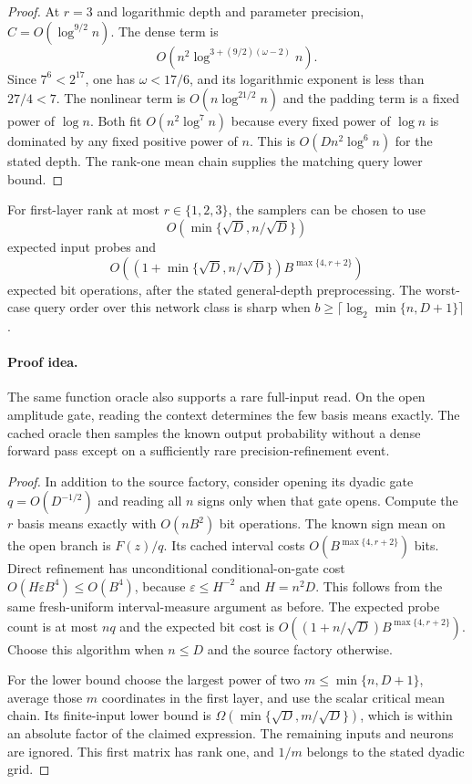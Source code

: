 \begin{proof}
At $r=3$ and logarithmic depth and parameter precision,
$C=O(\log^{9/2}n)$. The dense term is
\[
 O\!\left(n^2\log^{3+(9/2)(\omega-2)}n\right).
\]
Since $7^6<2^{17}$, one has $\omega<17/6$, and its logarithmic
exponent is less than $27/4<7$. The nonlinear term is
$O(n\log^{21/2}n)$ and the padding term is a fixed power of
$\log n$. Both fit $O(n^2\log^7n)$ because every fixed power
of $\log n$ is dominated by any fixed positive power of $n$.
This is $O(Dn^2\log^6n)$ for the stated depth. The rank-one mean
chain supplies the matching query lower bound.
\end{proof}

\begin{corollary}
\label{cor:rank-three-finite-input}
For first-layer rank at most $r\in\{1,2,3\}$, the samplers can be
chosen to use
\[
 O\!\left(\min\{\sqrt D,n/\sqrt D\}\right)
\]
expected input probes and
\[
 O\!\left(
 (1+\min\{\sqrt D,n/\sqrt D\})
 B^{\max\{4,r+2\}}\right)
\]
expected bit operations, after the stated general-depth preprocessing.
The worst-case query order over this network class is sharp when
$b\ge\lceil\log_2\min\{n,D+1\}\rceil$.
\end{corollary}

\paragraph{Proof idea.}
The same function oracle also supports a rare full-input read. On the open
amplitude gate, reading the context determines the few basis means exactly.
The cached oracle then samples the known output probability without a dense
forward pass except on a sufficiently rare precision-refinement event.

\begin{proof}
In addition to the source factory, consider opening its dyadic gate
$q=O(D^{-1/2})$ and reading all $n$ signs only when that gate opens.
Compute the $r$ basis means exactly with $O(nB^2)$ bit operations.
The known sign mean on the open branch is $F(z)/q$. Its cached
interval costs $O(B^{\max\{4,r+2\}})$ bits. Direct refinement
has unconditional conditional-on-gate cost
$O(H\varepsilon B^4)\le O(B^4)$, because
$\varepsilon\le H^{-2}$ and $H=n^2D$. This follows from the same
fresh-uniform interval-measure argument as before. The expected
probe count is at most $nq$ and the expected bit cost is
$O((1+n/\sqrt D)B^{\max\{4,r+2\}})$. Choose this algorithm
when $n\le D$ and the source factory otherwise.

For the lower bound choose the largest power of two
$m\le\min\{n,D+1\}$, average those $m$ coordinates in the
first layer, and use the scalar critical mean chain. Its finite-input
lower bound is
$\Omega(\min\{\sqrt D,m/\sqrt D\})$, which is within an absolute
factor of the claimed expression. The remaining inputs and neurons
are ignored. This first matrix has rank one, and $1/m$ belongs to
the stated dyadic grid.
\end{proof}
